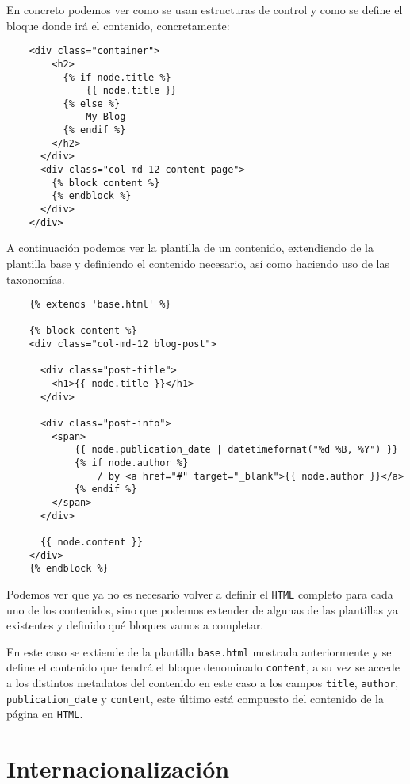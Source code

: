 En concreto podemos ver como se usan estructuras de control y como se define el bloque donde irá el contenido,
concretamente:

\begin{verbatim}
    <div class="container">
        <h2>
          {% if node.title %}
              {{ node.title }}
          {% else %}
              My Blog
          {% endif %}
        </h2>
      </div>
      <div class="col-md-12 content-page">
        {% block content %}
        {% endblock %}
      </div>
    </div>
\end{verbatim}

A continuación podemos ver la plantilla de un contenido, extendiendo de la plantilla base y definiendo
el contenido necesario, así como haciendo uso de las taxonomías.

\begin{verbatim}
    {% extends 'base.html' %}

    {% block content %}
    <div class="col-md-12 blog-post">

      <div class="post-title">
        <h1>{{ node.title }}</h1>
      </div>

      <div class="post-info">
        <span>
            {{ node.publication_date | datetimeformat("%d %B, %Y") }}
            {% if node.author %}
                / by <a href="#" target="_blank">{{ node.author }}</a>
            {% endif %}
        </span>
      </div>

      {{ node.content }}
    </div>
    {% endblock %}
\end{verbatim}

Podemos ver que ya no es necesario volver a definir el \texttt{HTML} completo para cada uno de los
contenidos, sino que podemos extender de algunas de las plantillas ya existentes y definido qué
bloques vamos a completar.

En este caso se extiende de la plantilla \texttt{base.html} mostrada anteriormente y se define el 
contenido que tendrá el bloque denominado \texttt{content}, a su vez se accede a los distintos 
metadatos del contenido en este caso a los campos \texttt{title}, \texttt{author}, 
\texttt{publication\_date} y \texttt{content}, este último está compuesto del contenido de la página
en \texttt{HTML}.


\section{Internacionalización}

